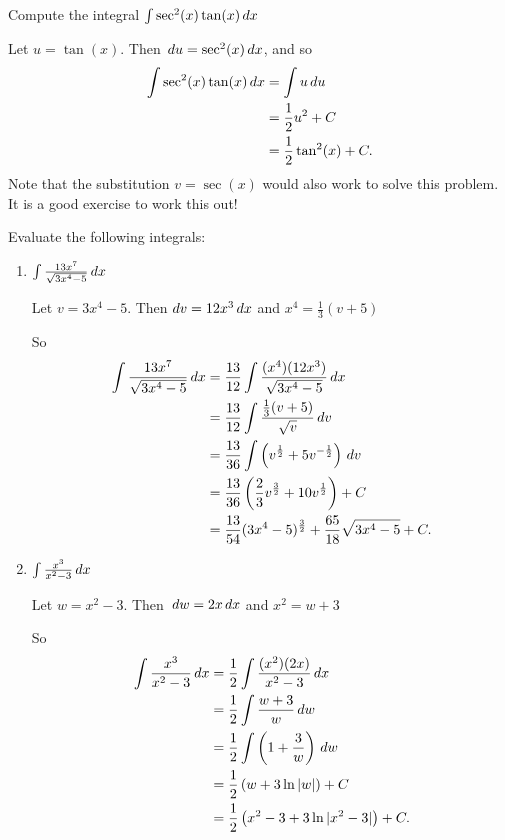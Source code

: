 \documentclass[nooutcomes]{ximera}
\begin{document}
\begin{problem}
Compute the integral $\int \sec^2(x) \tan(x) \,d x$
	\begin{freeResponse}
		Let $u = \tan(x)$.  Then $\,d u = \sec^2 (x) \,d x$, and so
		\begin{align*}
			\int \sec^2(x) \tan(x) \,d x &= \int u \,d u  \\
			&= \frac{1}{2} u^2 + C  \\
			&= \frac{1}{2} \tan^2(x) + C.
		\end{align*}
	   Note that the substitution $v=\sec(x)$ would also work to solve this problem.
		It is a good exercise to work this out!
	\end{freeResponse}
\end{problem}

\begin{problem}
Evaluate the following integrals:
	\begin{enumerate}
	\item  $\int \frac{13x^7}{\sqrt{3x^4-5}} \,d x$
		\begin{freeResponse}
		Let $v = 3x^4 - 5$.  Then $d v = 12 x^3 \,d x$ and $x^4 = \frac{1}{3} (v + 5)$

		So
			\begin{align*}
			\int \frac{13x^7}{\sqrt{3x^4-5}} \,d x &= \frac{13}{12} \int \frac{(x^4)(12 x^3)}{\sqrt{3x^4-5}} \,d x  \\
			&= \frac{13}{12} \int \frac{\frac{1}{3} (v+5)}{\sqrt{v}} \,d v  \\
			&= \frac{13}{36} \int \left( v^{\frac{1}{2}} + 5v^{-\frac{1}{2}} \right) \,d v  \\
			&= \frac{13}{36} \left( \frac{2}{3} v^{\frac{3}{2}} + 10 v^{\frac{1}{2}} \right) + C  \\
			&= \frac{13}{54} (3x^4-5)^{\frac{3}{2}} + \frac{65}{18} \sqrt{3x^4 - 5} + C.
			\end{align*}
		\end{freeResponse}

	\item  $\int \frac{x^3}{x^2 - 3} \,d x$
		\begin{freeResponse}
		Let $w = x^2 - 3$.  Then $\,d w = 2x \,d x$ and $x^2 = w + 3$

		So
			\begin{align*}
			\int \frac{x^3}{x^2 - 3} \,d x &= \frac{1}{2} \int \frac{(x^2)(2x)}{x^2 - 3} \,d x  \\
			&= \frac{1}{2} \int \frac{w+3}{w} \,d w  \\
			&= \frac{1}{2} \int \left(1 + \frac{3}{w} \right) \,d w  \\
			&= \frac{1}{2} \left( w + 3 \ln|w| \right) + C  \\
			&= \frac{1}{2} \left( x^2 - 3 + 3\ln|x^2-3| \right) + C.
			\end{align*}
		\end{freeResponse}
		

\end{enumerate}
\end{problem}
\end{document}
